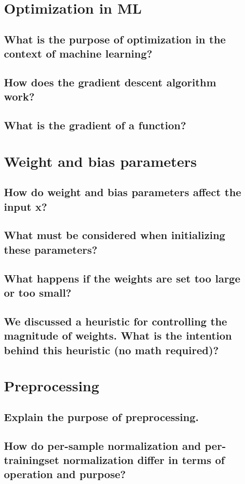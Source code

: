 \section{Optimization in ML}
\subsection{What is the purpose of optimization in the context of machine learning?}
\subsection{How does the gradient descent algorithm work?}
\subsection{What is the gradient of a function? }


\section{Weight and bias parameters}
\subsection{How do weight and bias parameters affect the input x?}
\subsection{What must be considered when initializing these parameters?}
\subsection{What happens if the weights are set too large or too small?}
\subsection{We discussed a heuristic for controlling the magnitude of weights. What is the intention behind this heuristic (no math required)?}

\section{Preprocessing}
\subsection{Explain the purpose of preprocessing.}
\subsection{How do per-sample normalization and per-trainingset normalization differ in terms of operation and purpose?}
